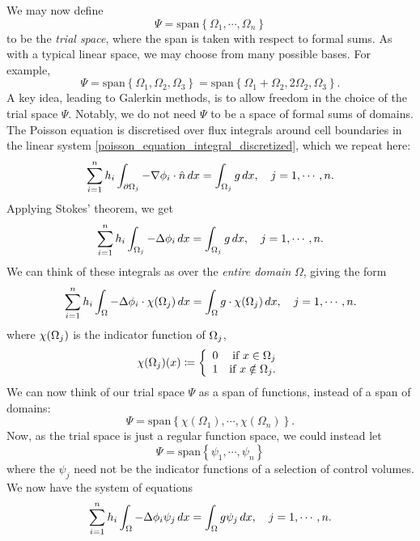 We may now define
    $$\Psi = \text{span}\left\{\Omega_1,\cdots,\Omega_n\right\}$$
to be the \textit{trial space}, where the span is taken with respect to formal sums. As with a typical linear space,
we may choose from many possible bases. For example,
    $$\Psi = \text{span}\left\{\Omega_1, \Omega_2, \Omega_3\right\} =
    \text{span}\left\{\Omega_1 + \Omega_2, 2\Omega_2, \Omega_3\right\}.$$
A key idea, leading to Galerkin methods, is to allow freedom in the choice of the trial space $\Psi$.
Notably, we do not need $\Psi$ to be a space of formal sums of domains.
The Poisson equation is discretised over flux integrals around cell boundaries in the linear system \eqref{poisson_equation_integral_discretized},
which we repeat here:
\begin{align*}
    \sum_{i=1}^n h_i\int_{{\partial\Omega}_j} -\nabla \phi_i \cdot \hat{n}\,dx = \int_{{\Omega}_j} g\,dx,\quad j=1,\cdots,n.
\end{align*}
Applying Stokes' theorem, we get
\begin{align*}
    \sum_{i=1}^n h_i\int_{{\Omega}_j} -\Delta \phi_i \,dx = \int_{{\Omega}_j} g\,dx,\quad j=1,\cdots,n.
\end{align*}
We can think of these integrals as over the \textit{entire domain} $\Omega$, giving the form
\begin{align*}
    \sum_{i=1}^n h_i\int_{{\Omega}} -\Delta \phi_i\cdot \chi({\Omega}_j)\,dx = \int_{{\Omega}} g\cdot\chi({\Omega}_j)\,dx,\quad j=1,\cdots,n.
\end{align*}
where $\chi({\Omega}_j)$ is the indicator function of ${\Omega}_j$,
\begin{align*}
    \chi({\Omega}_j)(x) \coloneqq \left\{\begin{array}{lr}
        0 &\text{if $x \in {\Omega}_j$}\\
        1 &\text{if $x \notin {\Omega}_j$.}\\
        \end{array}\right.
\end{align*}
We can now think of our trial space $\Psi$ as a span of functions, instead of a span of domains:
    $$\Psi = \text{span}\left\{\chi(\Omega_1),\cdots,\chi(\Omega_n)\right\}.$$
Now, as the trial space is just a regular function space, we could instead let
    $$\Psi = \text{span}\left\{\psi_1,\cdots,\psi_n\right\}$$
where the $\psi_j$
need not be the indicator functions of a selection of control volumes. We now have the system of equations
\begin{align*}
    \sum_{i=1}^n h_i\int_{{\Omega}} -\Delta \phi_i \psi_j\,dx = \int_{{\Omega}} g\psi_j\,dx,\quad j=1,\cdots,n.
\end{align*}
